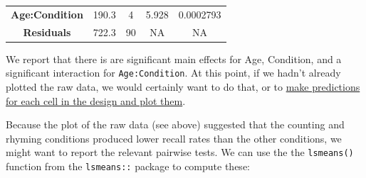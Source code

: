 \documentclass[]{article}
\theoremstyle{definition}
\theoremstyle{definition}
\theoremstyle{definition}
\theoremstyle{remark}
\begin{document}
\begin{longtable}[]{@{}ccccc@{}}
\begin{minipage}[t]{0.24\columnwidth}
\textbf{Age:Condition}\strut
\end{minipage} & \begin{minipage}[t]{0.11\columnwidth}\centering\strut
190.3\strut
\end{minipage} & \begin{minipage}[t]{0.06\columnwidth}\centering\strut
4\strut
\end{minipage} & \begin{minipage}[t]{0.12\columnwidth}\centering\strut
5.928\strut
\end{minipage} & \begin{minipage}[t]{0.13\columnwidth}\centering\strut
0.0002793\strut
\end{minipage}\tabularnewline
\begin{minipage}[t]{0.24\columnwidth}\centering\strut
\textbf{Residuals}\strut
\end{minipage} & \begin{minipage}[t]{0.11\columnwidth}\centering\strut
722.3\strut
\end{minipage} & \begin{minipage}[t]{0.06\columnwidth}\centering\strut
90\strut
\end{minipage} & \begin{minipage}[t]{0.12\columnwidth}\centering\strut
NA\strut
\end{minipage} & \begin{minipage}[t]{0.13\columnwidth}\centering\strut
NA\strut
\end{minipage}\tabularnewline
\bottomrule
\end{longtable}

We report that there is are significant main effects for Age, Condition,
and a significant interaction for \texttt{Age:Condition}. At this point,
if we hadn't already plotted the raw data, we would certainly want to do
that, or to \protect\hyperlink{understanding-interactions}{make
predictions for each cell in the design and plot them}.

Because the plot of the raw data (see above) suggested that the counting
and rhyming conditions produced lower recall rates than the other
conditions, we might want to report the relevant pairwise tests. We can
use the the \texttt{lsmeans()} function from the \texttt{lsmeans::}
package to compute these:
\end{document}
